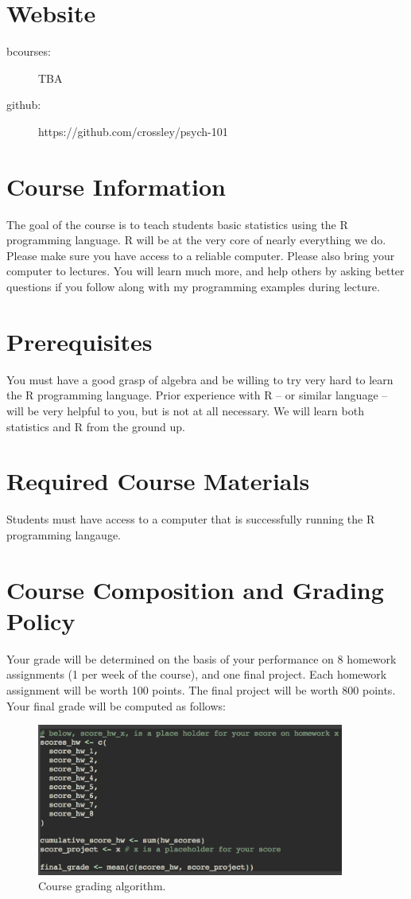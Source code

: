 \documentclass{article}
\begin{document}
\section{Website}
\begin{description}
\item[bcourses:] TBA
\item[github:] https://github.com/crossley/psych-101
\end{description}

\section{Course Information}
The goal of the course is to teach students basic statistics using the R
programming language. R will be at the very core of nearly everything we do.
Please make sure you have access to a reliable computer. Please also bring your
computer to lectures. You will learn much more, and help others by asking better
questions if you follow along with my programming examples during lecture.

\section{Prerequisites}
You must have a good grasp of algebra and be willing to try very hard to learn
the R programming language. Prior experience with R -- or similar language --
will be very helpful to you, but is not at all necessary. We will learn both
statistics and R from the ground up.

\section{Required Course Materials}
Students must have access to a computer that is successfully running the R
programming langauge.

\section{Course Composition and Grading Policy}
Your grade will be determined on the basis of your performance on 8 homework
assignments (1 per week of the course), and one final project. Each homework
assignment will be worth 100 points. The final project will be worth 800
points. Your final grade will be computed as follows:

\begin{figure}[h]
  \caption{Course grading algorithm.}
  \centering
    \includegraphics[width=0.9\textwidth]{final_grade}
\end{figure}
\end{document}
